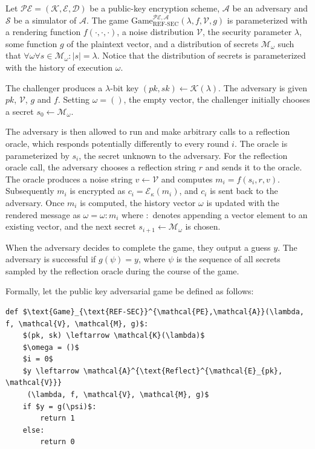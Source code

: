 \documentclass[conference, letterpaper, 10pt]{IEEEtran}
\begin{document}
Let $\mathcal{PE} = (\mathcal{K}, \mathcal{E}, \mathcal{D})$ be a public-key
encryption scheme, $\mathcal{A}$ be an adversary and $\mathcal{S}$ be a
simulator of $\mathcal{A}$.  The game
$\text{Game}_{\text{REF-SEC}}^{\mathcal{PE},\mathcal{A}}(\lambda,  f,
\mathcal{V}, g)$ is parameterized with a rendering function $f(\cdot, \cdot,
\cdot)$, a noise distribution $\mathcal{V}$, the security parameter $\lambda$,
some function $g$ of the plaintext vector, and a distribution of secrets $\mathcal{M}_\omega$
such that $\forall \omega \forall s \in \mathcal{M}_\omega: |s| = \lambda$. Notice
that the distribution of secrets is parameterized with the history of execution
$\omega$.

The challenger produces a $\lambda$-bit key $(pk, sk) \leftarrow
\mathcal{K}(\lambda)$. The adversary is given $pk$, $\mathcal{V}$, $g$ and $f$.
Setting $\omega = ()$, the empty vector, the challenger initially chooses
a secret $s_0 \leftarrow \mathcal{M}_\omega$.

The adversary is then allowed to run and make arbitrary calls to a reflection
oracle, which responds potentially differently to every round $i$. The oracle
is parameterized by $s_i$, the secret unknown to the
adversary.  For the reflection oracle call, the adversary chooses a reflection
string $r$ and sends it to the oracle. The oracle produces a noise string
$v \leftarrow \mathcal{V}$ and computes $m_i = f(s_i, r, v)$. Subsequently
$m_i$ is encrypted as $c_i = \mathcal{E}_\kappa(m_i)$, and $c_i$ is sent back
to the adversary. Once $m_i$ is computed, the history vector $\omega$ is updated
with the rendered message as $\omega = \omega : m_i$ where $:$ denotes appending
a vector element to an existing vector, and the next secret $s_{i+1} \leftarrow \mathcal{M}_\omega$
is chosen.

When the adversary decides to complete the game, they output a guess $y$. The
adversary is successful if $g(\psi) = y$, where $\psi$ is the sequence
of all secrets sampled by the reflection oracle during the course of the game.

Formally, let the public key adversarial game be defined as follows:

\begin{lstlisting}[texcl,mathescape]
def $\text{Game}_{\text{REF-SEC}}^{\mathcal{PE},\mathcal{A}}(\lambda, f, \mathcal{V}, \mathcal{M}, g)$:
    $(pk, sk) \leftarrow \mathcal{K}(\lambda)$
    $\omega = ()$
    $i = 0$
    $y \leftarrow \mathcal{A}^{\text{Reflect}^{\mathcal{E}_{pk}, \mathcal{V}}}
     (\lambda, f, \mathcal{V}, \mathcal{M}, g)$
    if $y = g(\psi)$:
        return 1
    else:
        return 0
\end{lstlisting}
\end{document}
